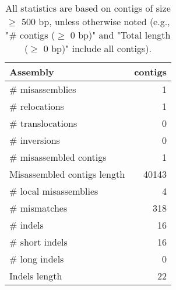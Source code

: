 \documentclass[12pt,a4paper]{article}
\begin{document}
\begin{table}[ht]
\begin{center}
\caption{All statistics are based on contigs of size $\geq$ 500 bp, unless otherwise noted (e.g., "\# contigs ($\geq$ 0 bp)" and "Total length ($\geq$ 0 bp)" include all contigs).}
\begin{tabular}{|l*{1}{|r}|}
\hline
Assembly & contigs \\ \hline
\# misassemblies & 1 \\ \hline
\hspace{5mm}\# relocations & 1 \\ \hline
\hspace{5mm}\# translocations & 0 \\ \hline
\hspace{5mm}\# inversions & 0 \\ \hline
\# misassembled contigs & 1 \\ \hline
Misassembled contigs length & 40143 \\ \hline
\# local misassemblies & 4 \\ \hline
\# mismatches & 318 \\ \hline
\# indels & 16 \\ \hline
\hspace{5mm}\# short indels & 16 \\ \hline
\hspace{5mm}\# long indels & 0 \\ \hline
Indels length & 22 \\ \hline
\end{tabular}
\end{center}
\end{table}
\end{document}
